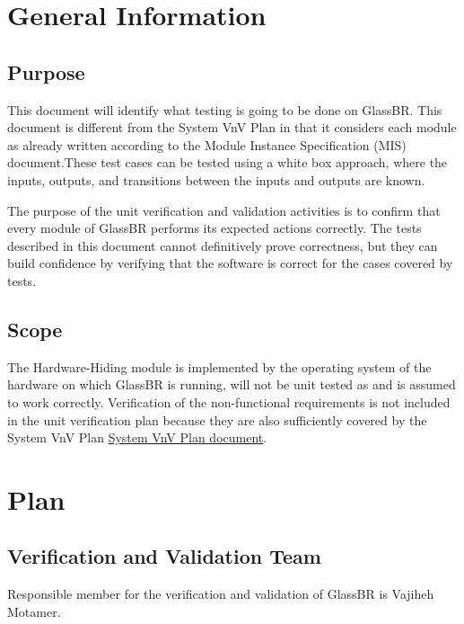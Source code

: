 \documentclass[12pt]{article}
\newcommand{\progname}{GlassBR}
\begin{document}
\section{General Information}

\subsection{Purpose}

\noindent This document will identify what testing is going to be done on
\progname{}.  This document is different from the System VnV Plan in that it
considers each module as already written according to the Module Instance
Specification (MIS) document.These  test cases
can be tested using a white box approach, where the inputs, outputs, and
transitions between the inputs and outputs are known.

\noindent The purpose of the unit verification and validation activities is to 
confirm that every module of \progname{} performs its expected actions 
correctly. The tests described in this document cannot definitively prove 
correctness, but they can build confidence by verifying that the software is 
correct for the cases covered by tests.

\subsection{Scope} \label{Scope}

\noindent The Hardware-Hiding module is implemented by the operating system of the hardware on which \progname{} 
is running, will not be unit tested as 
 and is assumed to work correctly. Verification of the non-functional requirements is 
not included in the unit verification plan because they are also sufficiently 
covered by the System VnV Plan \href{https://github.com/smiths/caseStudies/blob/glass_UnitVnV/CaseStudies/glass/docs/VnVPlan/SystVnVPlan/SystVnVPlan.pdf}
{System VnV Plan document}.  

\section{Plan} \label{sec_Plan}
	
\subsection{Verification and Validation Team}
Responsible member for the verification and validation of GlassBR is Vajiheh Motamer.
\end{document}
